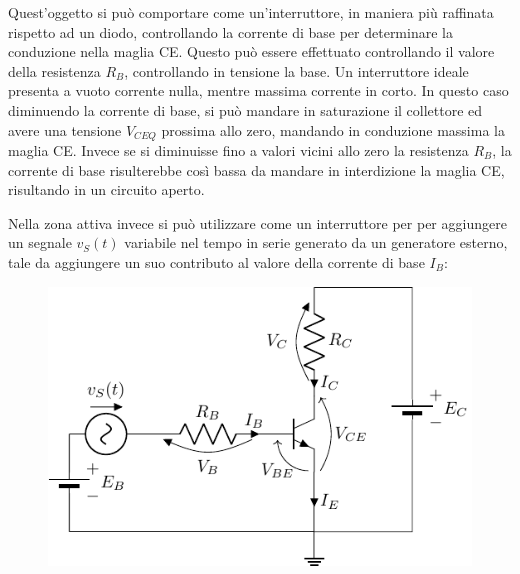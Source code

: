\documentclass{article}
\numberwithin{equation}{subsection}
\begin{document}
Quest'oggetto si può comportare come un'interruttore, in maniera più raffinata rispetto ad un diodo, controllando la corrente di base per determinare la conduzione nella 
maglia CE. Questo può essere effettuato controllando il valore della resistenza $R_B$, controllando in tensione la base. 
Un interruttore ideale presenta a vuoto corrente nulla, mentre massima corrente in corto. In questo caso diminuendo la corrente di base, si può mandare in saturazione il 
collettore ed avere una tensione $V_{CEQ}$ prossima allo zero, mandando in conduzione massima la maglia CE. Invece se si diminuisse fino a valori vicini allo zero la 
resistenza $R_B$, la corrente di base risulterebbe così bassa da mandare in interdizione la maglia CE, risultando in un circuito aperto. 

Nella zona attiva invece si può utilizzare come un interruttore per per aggiungere un segnale $v_S(t)$ variabile nel tempo in serie generato da un generatore esterno, tale 
da aggiungere un suo contributo al valore della corrente di base $I_B$:
\begin{figure}[H]%
    \centering
    \includegraphics{bjt-circuito-segnale.pdf}%
    \label{fig:bjt-circuito-segnale}
\end{figure}
\end{document}
